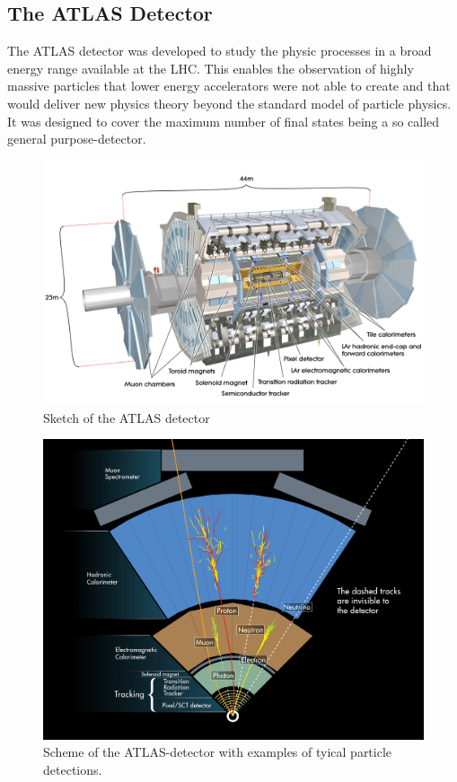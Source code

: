 \subsection{The ATLAS Detector}

The ATLAS detector was developed to study the physic processes in a broad energy range available at the LHC. This enables the observation of highly massive particles that lower energy accelerators were not able to create and that would deliver new physics theory beyond the standard model of particle physics.
It was designed to cover the maximum number of final states being a so called general purpose-detector.

\begin{figure}
  \centering
  \includegraphics[scale=0.15]{figures_LHC/atlas-detector}
  \caption{Sketch of the ATLAS detector\cite{Pequenao:1095924}}
  \label{fig:atlas}
\end{figure}



\begin{figure}
  \centering
  \includegraphics[scale=0.6]{figures_LHC/atlas-abstract}
  \caption[Scheme of the ATLAS-detector.]{Scheme of the ATLAS-detector with examples of tyical particle detections. \cite{Pequenao:1095924}}
  \label{fig:atlas_sketch}
\end{figure}

